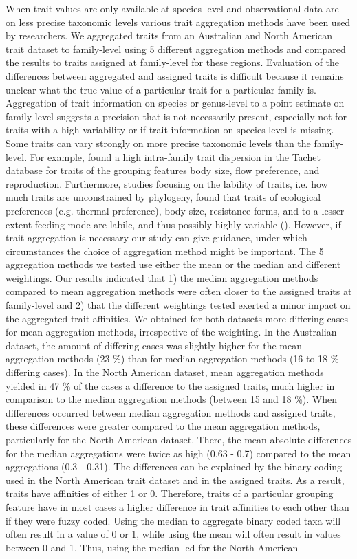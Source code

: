 \documentclass{article}
\begin{document}
When trait values are only available at species-level and observational data are on less precise taxonomic levels various trait aggregation methods have been used by researchers. We aggregated traits from an Australian and North American trait dataset to family-level using 5 different aggregation methods and compared the results to traits assigned at family-level for these regions. Evaluation of the differences between aggregated and assigned traits is difficult because it remains unclear what the true value of a particular trait for a particular family is. Aggregation of trait information on species or genus-level to a point estimate on family-level suggests a precision that is not necessarily present, especially not for traits with a high variability or if trait information on species-level is missing. Some traits can vary strongly on more precise taxonomic levels than the family-level. For example, \citet{monaghan_improving_2013} found a high intra-family trait dispersion in the Tachet database for traits of the grouping features body size, flow preference, and reproduction. Furthermore, studies focusing on the lability of traits, i.e. how much traits are unconstrained by phylogeny, found that traits of ecological preferences (e.g. thermal preference), body size, resistance forms, and to a lesser extent feeding mode are labile, and thus possibly highly variable (\cite{poff_functional_2006, wilkes_traitbased_2020}). However, if trait aggregation is necessary our study can give guidance, under which circumstances the choice of aggregation method might be important. The 5 aggregation methods we tested use either the mean or the median and different weightings. Our results indicated that 1) the median aggregation methods compared to mean aggregation methods were often closer to the assigned traits at family-level and 2) that the different weightings tested exerted a minor impact on the aggregated trait affinities. We obtained for both datasets more differing cases for mean aggregation methods, irrespective of the weighting. In the Australian dataset, the amount of differing cases was slightly higher for the mean aggregation methods (23 \%) than for median aggregation methods (16 to 18 \% differing cases). In the North American dataset, mean aggregation methods yielded in 47 \% of the cases a difference to the assigned traits, much higher in comparison to the median aggregation methods (between 15 and 18 \%). When differences occurred between median aggregation methods and assigned traits, these differences were greater compared to the mean aggregation methods, particularly for the North American dataset. There, the mean absolute differences for the median aggregations were twice as high (0.63 - 0.7) compared to the mean aggregations (0.3 - 0.31). The differences can be explained by the binary coding used in the North American trait dataset and in the assigned traits. As a result, traits have affinities of either 1 or 0. Therefore, traits of a particular grouping feature have in most cases a higher difference in trait affinities to each other than if they were fuzzy coded. Using the median to aggregate binary coded taxa will often result in a value of 0 or 1, while using the mean will often result in values between 0 and 1. Thus, using the median led for the North American 
\end{document}
